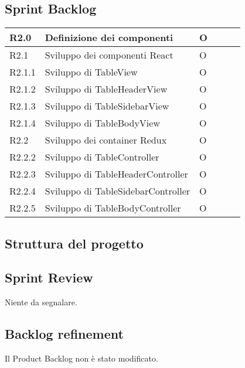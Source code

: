 \subsection{Sprint Backlog}
\begin{longtable} {
		|>{}p{10mm}| 
		|>{}p{90mm}|
		|>{}p{15mm}|
		|>{}p{15mm}|
		|>{}p{15mm}|
		>{}p{0mm}}
	\hline
R2.0   & \textbf{Definizione dei componenti} & O\\ \hline
R2.1   & Sviluppo dei componenti React 		  & O\\ \hline
R2.1.1 & Sviluppo di TableView                & O\\ \hline
R2.1.2 & Sviluppo di TableHeaderView          & O\\ \hline
R2.1.3 & Sviluppo di TableSidebarView         & O \\ \hline
R2.1.4 & Sviluppo di TableBodyView            & O\\ \hline
R2.2   & Sviluppo dei container Redux         & O  \\ \hline
R2.2.2 & Sviluppo di TableController          & O   \\ \hline
R2.2.3 & Sviluppo di TableHeaderController    & O      \\ \hline
R2.2.4 & Sviluppo di TableSidebarController   & O      \\ \hline
R2.2.5 & Sviluppo di TableBodyController      & O   \\ \hline
\end{longtable}
\subsection{Struttura del progetto}

\subsection{Sprint Review}
Niente da segnalare.

\subsection{Backlog refinement}
Il Product Backlog non è stato modificato.

